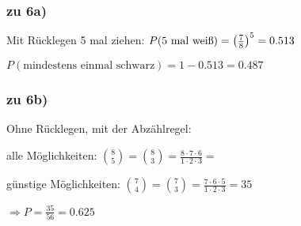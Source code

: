 \subsubsection{zu 6a)}
Mit Rücklegen 5 mal ziehen: $ P(\textrm{5 mal weiß}) =  \left( \frac{7}{8} \right) ^5 = 0.513 $

$ P(\textrm{mindestens einmal schwarz}) = 1 - 0.513 = 0.487 $

\subsubsection{zu 6b)}
Ohne Rücklegen, mit der Abzählregel: 

alle Möglichkeiten: $ \binom 8 5 = \binom 8 3 = \frac{8\cdot 7\cdot 6}{1\cdot 2\cdot 3} = $

günstige Möglichkeiten: $ \binom 7 4 = \binom 7 3 = \frac{7\cdot 6\cdot 5}{1\cdot 2\cdot 3} = 35 $ 

$\Rightarrow P = \frac{35}{56} = 0.625 $